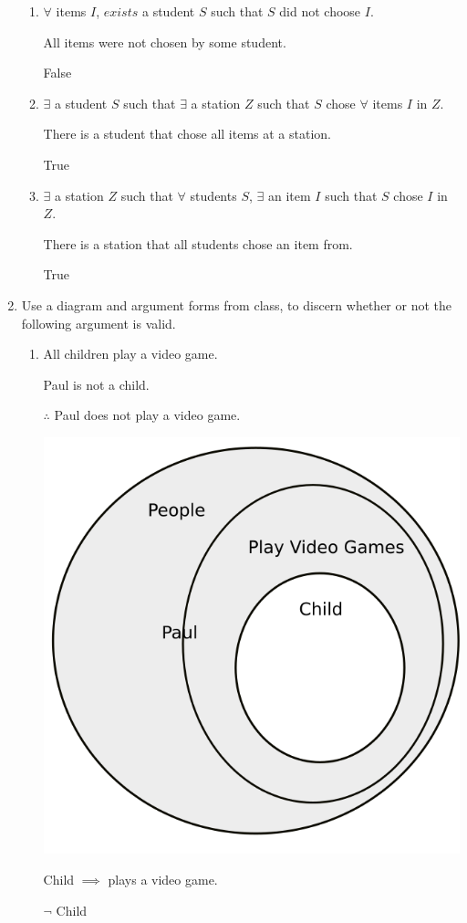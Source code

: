 \documentclass[12pt,letterpaper,titlepage]{article}
\begin{document}
\begin{raggedright}
\begin{enumerate}
\begin{enumerate}[label=(\alph*)]
    \item $\forall$ items $I$, $exists$ a student $S$ such that $S$ did not choose $I$.

	  All items were not chosen by some student.

	  False

    \item $\exists$ a student $S$ such that $\exists$ a station $Z$ such that $S$ chose $∀$ items $I$ in $Z$.

	  There is a student that chose all items at a station.
	  
	  True

    \item $\exists$ a station $Z$ such that $\forall$ students $S$, $∃$ an item $I$ such that $S$ chose $I$ in $Z$.

	  There is a station that all students chose an item from.
	  
	  True

  \end{enumerate}

\pagebreak

\item Use a diagram and argument forms from class, to discern whether or not the following argument is valid.

  \begin{enumerate}[label=(\alph*)]
    \item All children play a video game. 
    
    	  Paul is not a child. 
    
          $\therefore$ Paul does not play a video game.
           
      \includegraphics[width=.375\textwidth, height=\textheight, keepaspectratio=true]{hw3q8a}

	  Child $\implies$ plays a video game.
	  
	  $\neg$ Child
	  

\end{enumerate}
\end{enumerate}
\end{raggedright}
\end{document}
